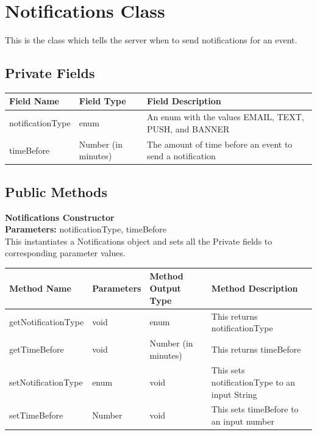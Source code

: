 \documentclass{scrreprt}
\begin{document}
\section{Notifications Class}

This is the class which tells the server when to send notifications for an event.

\subsection{Private Fields}

\begin{center}
\begin{longtable}{ | p{3cm} | p{6cm} | p{6cm} | }
\hline
\textbf{Field Name} & \textbf{Field Type} & \textbf{Field Description} \\
\hline
notificationType & enum & An enum with the values EMAIL, TEXT, PUSH, and BANNER \\
\hline
timeBefore & Number (in minutes) & The amount of time before an event to send a notification \\
\hline
\end{longtable}
\end{center}

\subsection{Public Methods}

\textbf{Notifications Constructor} \\
\textbf{Parameters:} notificationType, timeBefore \\
This instantiates a Notifications object and sets all the Private fields to corresponding parameter values.

\begin{center}
\begin{longtable}{ | p{4cm} | p{3cm} | p{3cm} | p{5cm} | }
\hline
\textbf{Method Name} & \textbf{Parameters} & \textbf{Method Output Type} & \textbf{Method Description} \\
\hline
getNotificationType & void & enum & This returns notificationType \\
\hline
getTimeBefore & void & Number (in minutes) & This returns timeBefore \\
\hline
setNotificationType & enum & void & This sets notificationType to an input String \\
\hline
setTimeBefore & Number & void & This sets timeBefore to an input number \\
\hline
\end{longtable}
\end{center}
\end{document}
